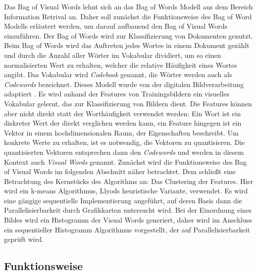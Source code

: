 Das Bag of Visual Words lehnt sich an das Bag of Words Modell aus dem Bereich Information Retrival an. Daher soll zunächst die Funktionsweise des Bag of Word Modells erläutert werden, um darauf aufbauend den Bag of Visual Words einzuführen.\newline 
Der Bag of Words wird zur Klassifizierung von Dokumenten genutzt. Beim Bag of Words wird das Auftreten jedes Wortes in einem Dokument gezählt und durch die Anzahl aller Wörter im Vokabular dividiert, um so einen normalisierten Wert zu erhalten, welcher die relative Häufigkeit eines Wortes angibt. Das Vokabular wird \textit{Codebook} genannt, die Wörter werden auch als \textit{Codewords} bezeichnet.\newline
Dieses Modell wurde von der digitalen Bildverarbeitung adaptiert \cite{bok2004}. Es wird anhand der Features von Trainingsbildern ein visuelles Vokabular gelernt, das zur Klassifizierung von Bildern dient. Die Features können aber nicht direkt statt der Worthäufigkeit verwendet werden: Ein Wort ist ein diskreter Wert der direkt verglichen werden kann, ein Feature hingegen ist ein Vektor in einem hochdimensionalen Raum, der Eigenschaften beschreibt. Um konkrete Werte zu erhalten, ist es notwendig, die Vektoren zu quantisieren. Die quantisierten Vektoren entsprechen dann den \textit{Codewords} und werden in diesem Kontext auch \textit{Visual Words} genannt. \newline
Zunächst wird die Funktionsweise des Bag of Visual Words im folgenden Abschnitt näher betrachtet. Dem schließt eine Betrachtung des Kernstücks des Algorithms an: Das Clustering der Features. Hier wird ein k-means Algorithmus, Llyods heuristische Variante, verwendet. Es wird eine gängige sequentielle Implementierung angeführt, auf deren Basis dann die Parallelisierbarkeit durch Grafikkarten untersucht wird.\newline
Bei der Einordnung eines Bildes wird ein Histogramm der Visual Words generiert, daher wird im Anschluss ein sequentieller Histogramm Algorithmus vorgestellt, der auf Parallelisierbarkeit geprüft wird.

\subsection{Funktionsweise}

